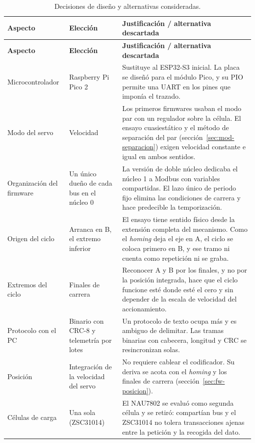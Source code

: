\begin{longtable}{@{}L{0.19\textwidth}L{0.21\textwidth}L{0.48\textwidth}@{}}
\caption{Decisiones de diseño y alternativas consideradas.}\label{tab:decisiones}\\
\toprule
\textbf{Aspecto} & \textbf{Elección} & \textbf{Justificación / alternativa descartada} \\
\midrule
\endfirsthead
\toprule
\textbf{Aspecto} & \textbf{Elección} & \textbf{Justificación / alternativa descartada} \\
\midrule
\endhead
Microcontrolador & Raspberry Pi Pico 2 & Sustituye al ESP32-S3 inicial. La placa se diseñó para el módulo Pico, y su PIO permite una UART en los pines que imponía el trazado. \\
Modo del servo & Velocidad & Los primeros firmwares usaban el modo par con un regulador sobre la célula. El ensayo cuasiestático y el método de separación del par (sección~\ref{sec:mod-separacion}) exigen velocidad constante e igual en ambos sentidos. \\
Organización del firmware & Un único dueño de cada bus en el núcleo 0 & La versión de doble núcleo dedicaba el núcleo 1 a Modbus con variables compartidas. El lazo único de periodo fijo elimina las condiciones de carrera y hace predecible la temporización. \\
Origen del ciclo & Arranca en B, el extremo inferior & El ensayo tiene sentido físico desde la extensión completa del mecanismo. Como el \emph{homing} deja el eje en A, el ciclo se coloca primero en B, y ese tramo ni cuenta como repetición ni se graba. \\
Extremos del ciclo & Finales de carrera & Reconocer A y B por los finales, y no por la posición integrada, hace que el ciclo funcione esté donde esté el cero y sin depender de la escala de velocidad del accionamiento. \\
Protocolo con el PC & Binario con CRC-8 y telemetría por lotes & Un protocolo de texto ocupa más y es ambiguo de delimitar. Las tramas binarias con cabecera, longitud y CRC se resincronizan solas. \\
Posición & Integración de la velocidad del servo & No requiere cablear el codificador. Su deriva se acota con el \emph{homing} y los finales de carrera (sección~\ref{sec:fw-posicion}). \\
Células de carga & Una sola (ZSC31014) & El NAU7802 se evaluó como segunda célula y se retiró: compartían bus y el ZSC31014 no tolera transacciones ajenas entre la petición y la recogida del dato. \\

\end{longtable}
